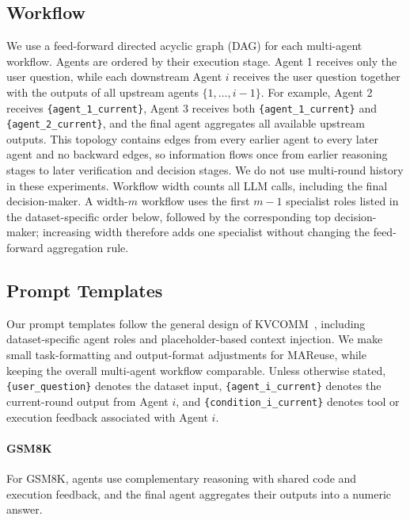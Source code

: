 \documentclass[letterpaper]{article} %
\newcommand{\placeholder}[1]{\texttt{\{#1\}}}
\begin{document}
\subsection{Workflow}

We use a feed-forward directed acyclic graph (DAG) for each multi-agent workflow. Agents are ordered by their execution stage. Agent 1 receives only the user question, while each downstream Agent $i$ receives the user question together with the outputs of all upstream agents $\{1,\ldots,i-1\}$. For example, Agent 2 receives \placeholder{agent\_1\_current}, Agent 3 receives both \placeholder{agent\_1\_current} and \placeholder{agent\_2\_current}, and the final agent aggregates all available upstream outputs. This topology contains edges from every earlier agent to every later agent and no backward edges, so information flows once from earlier reasoning stages to later verification and decision stages. We do not use multi-round history in these experiments. Workflow width counts all LLM calls, including the final decision-maker. A width-$m$ workflow uses the first $m-1$ specialist roles listed in the dataset-specific order below, followed by the corresponding top decision-maker; increasing width therefore adds one specialist without changing the feed-forward aggregation rule.

\subsection{Prompt Templates}

Our prompt templates follow the general design of KVCOMM~\citep{DBLP:journals/corr/abs-2510-12872}, including dataset-specific agent roles and placeholder-based context injection. We make small task-formatting and output-format adjustments for MAReuse, while keeping the overall multi-agent workflow comparable. Unless otherwise stated, \placeholder{user\_question} denotes the dataset input, \placeholder{agent\_i\_current} denotes the current-round output from Agent $i$, and \placeholder{condition\_i\_current} denotes tool or execution feedback associated with Agent $i$.

\paragraph{GSM8K}

For GSM8K, agents use complementary reasoning with shared code and execution feedback, and the final agent aggregates their outputs into a numeric answer.
\end{document}
